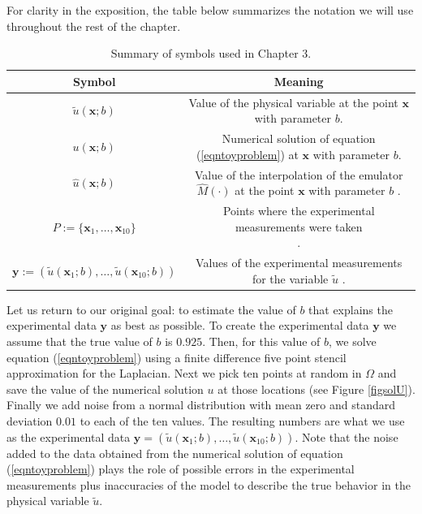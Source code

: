 \documentclass{sfuthesis}
\newcommand{\x}{\textbf{x}}
\newcommand{\y}{\textbf{y}}
\begin{document}
For clarity in the exposition, the table below  summarizes the notation 
we will use throughout the rest of the chapter.





\begin{table}[H]
\centering
\begin{tabular}{|c|c|}
\hline 
Symbol & Meaning \tabularnewline 
\hline 
\hline
\hline 
$\tilde{u}(\x;b)$ & \pbox{7cm}{Value of the physical variable at the point $\x$
with parameter $b$.\\} \tabularnewline 
\hline 
\hline
$u(\x;b)$ & \pbox{7cm}{Numerical solution of equation (\ref{eqntoyproblem})
at $\x$ with parameter $b$.\\} \tabularnewline
\hline
\hline 
$\hat{u}(\x;b)$ & \pbox{7cm}{Value of the interpolation of the emulator $\hat{M}(\cdot)$ at the point $\x$ with parameter
$b$\\}.  \tabularnewline
\hline
\hline 
$P:=\{\x_{1},\ldots,\x_{10}\}$ & \pbox{7cm}{Points where the experimental measurements were taken\\}.  \tabularnewline
\hline
\hline 
$\y:=(\tilde{u}(\x_{1};b),\ldots,\tilde{u}(\x_{10};b))$ & \pbox{7cm}{Values of the experimental measurements for the variable $\tilde{u}$\\}.  \tabularnewline
\hline
\end{tabular}

\caption{Summary of symbols used in Chapter 3.}
\label{tabSymboltable}
\end{table}
Let us return to our original goal:  to estimate the value of $b$ that explains  the experimental data 
$\y$ as best as possible. To create the experimental data $\y$ we 
assume that the true value of $b$ is $0.925$. Then, for this value of $b$,  we solve equation (\ref{eqntoyproblem})
using a finite difference five point  stencil approximation for the Laplacian. 
Next we pick  ten points at random in $\Omega$ and save the value of the numerical 
solution $u$ at those locations (see Figure \ref{figsolU}).  Finally we add  noise from
a normal distribution with mean zero and standard deviation $0.01$ to each  of the ten values. 
The resulting numbers  are what we use
as the experimental data $\y=(\tilde{u}(\x_{1};b),\ldots,\tilde{u}(\x_{10};b))$. 
Note that the noise added to the data obtained from the
numerical  solution of equation
(\ref{eqntoyproblem}) plays the role of possible  
errors in the experimental measurements plus inaccuracies of the 
model to describe the true behavior in the physical variable $\tilde{u}$.
\end{document}
